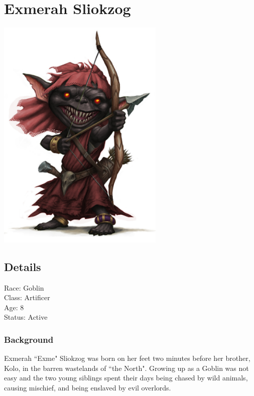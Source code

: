 \section{Exmerah Sliokzog}
\begin{center}
\includegraphics[width=80mm]{./content/img/exme1.png}
\begin{figure}[h]
\end{figure}
\end{center}

\subsection*{Details} 

\noindent

Race: 	Goblin \\
Class: 	Artificer \\
Age: 	8 \\
Status: Active 

\subsubsection{Background}

Exmerah ``Exme" Sliokzog was born on her feet two minutes before her brother, Kolo, in the barren wastelands of ``the North".  Growing up as a Goblin was not easy and the two young siblings spent their days being chased by wild animals, causing mischief, and being enslaved by evil overlords.  

